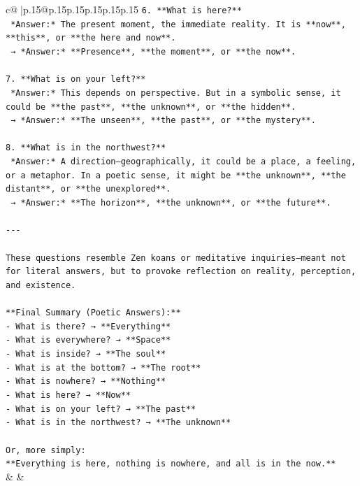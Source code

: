 \documentclass{article}
\begin{document}
{\begin{supertabular}{c@{$\;$}|p{.15\linewidth}@{}p{.15\linewidth}p{.15\linewidth}p{.15\linewidth}p{.15\linewidth}p{.15\linewidth}}
{{{\texttt{6. **What is here?**  } \\
\texttt{   *Answer:* The present moment, the immediate reality. It is **now**, **this**, or **the here and now**.  } \\
\texttt{   → *Answer:* **Presence**, **the moment**, or **the now**.} \\
\\ 
\texttt{7. **What is on your left?**  } \\
\texttt{   *Answer:* This depends on perspective. But in a symbolic sense, it could be **the past**, **the unknown**, or **the hidden**.  } \\
\texttt{   → *Answer:* **The unseen**, **the past**, or **the mystery**.} \\
\\ 
\texttt{8. **What is in the northwest?**  } \\
\texttt{   *Answer:* A direction—geographically, it could be a place, a feeling, or a metaphor. In a poetic sense, it might be **the unknown**, **the distant**, or **the unexplored**.  } \\
\texttt{   → *Answer:* **The horizon**, **the unknown**, or **the future**.} \\
\\ 
\texttt{{-}{-}{-}} \\
\\ 
\texttt{These questions resemble Zen koans or meditative inquiries—meant not for literal answers, but to provoke reflection on reality, perception, and existence.} \\
\\ 
\texttt{**Final Summary (Poetic Answers):**  } \\
\texttt{{-} What is there? → **Everything**  } \\
\texttt{{-} What is everywhere? → **Space**  } \\
\texttt{{-} What is inside? → **The soul**  } \\
\texttt{{-} What is at the bottom? → **The root**  } \\
\texttt{{-} What is nowhere? → **Nothing**  } \\
\texttt{{-} What is here? → **Now**  } \\
\texttt{{-} What is on your left? → **The past**  } \\
\texttt{{-} What is in the northwest? → **The unknown**} \\
\\ 
\texttt{Or, more simply:  } \\
\texttt{**Everything is here, nothing is nowhere, and all is in the now.**} \\
            }
        }
    }
    & & \\ \\


\end{supertabular}}
\end{document}
